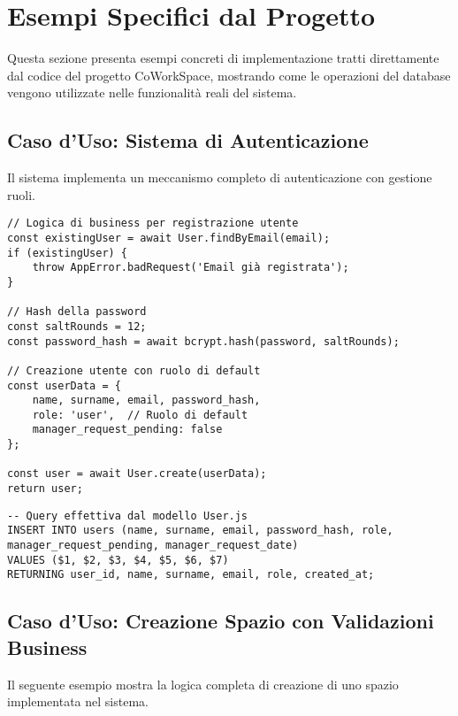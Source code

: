 \newpage

\section{Esempi Specifici dal Progetto}

Questa sezione presenta esempi concreti di implementazione tratti direttamente dal codice del progetto CoWorkSpace, mostrando come le operazioni del database vengono utilizzate nelle funzionalità reali del sistema.

\subsection{Caso d'Uso: Sistema di Autenticazione}

Il sistema implementa un meccanismo completo di autenticazione con gestione ruoli.

\begin{lstlisting}[caption=Registrazione Utente con Validazioni (AuthService.js)]
// Logica di business per registrazione utente
const existingUser = await User.findByEmail(email);
if (existingUser) {
    throw AppError.badRequest('Email già registrata');
}

// Hash della password
const saltRounds = 12;
const password_hash = await bcrypt.hash(password, saltRounds);

// Creazione utente con ruolo di default
const userData = {
    name, surname, email, password_hash,
    role: 'user',  // Ruolo di default
    manager_request_pending: false
};

const user = await User.create(userData);
return user;
\end{lstlisting}

\begin{lstlisting}[caption=Query SQL di Registrazione Utente]
-- Query effettiva dal modello User.js
INSERT INTO users (name, surname, email, password_hash, role, manager_request_pending, manager_request_date)
VALUES ($1, $2, $3, $4, $5, $6, $7)
RETURNING user_id, name, surname, email, role, created_at;
\end{lstlisting}

\newpage

\subsection{Caso d'Uso: Creazione Spazio con Validazioni Business}

Il seguente esempio mostra la logica completa di creazione di uno spazio implementata nel sistema.

